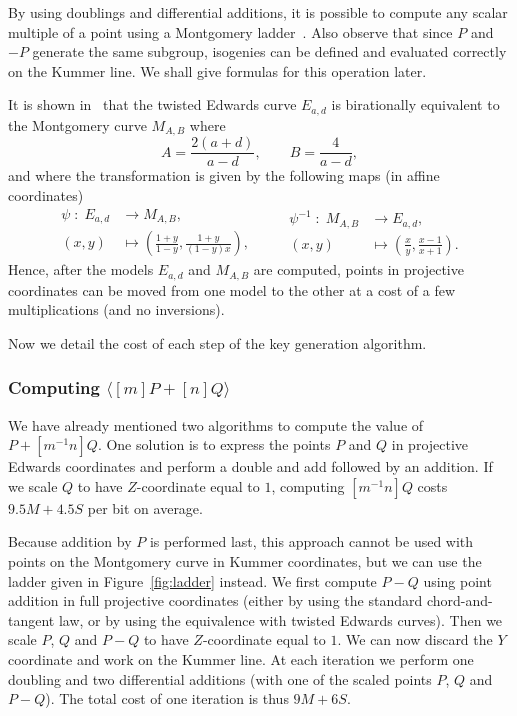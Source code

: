 \documentclass[jmc]{degruyter-journal-a}
\theoremstyle{definition}
\newcommand{\cyc}[1]{{\langle #1 \rangle}}
\begin{document}
By using doublings and differential additions, it is possible to
compute any scalar multiple of a point using a Montgomery
ladder~\cite{montgomery}. Also observe that since $P$ and $-P$
generate the same subgroup, isogenies can be defined and evaluated
correctly on the Kummer line. We shall give formulas for this
operation later.

It is shown in~\cite{twisted-edwards} that the twisted Edwards curve
$E_{a,d}$ is birationally equivalent to the Montgomery curve $M_{A,B}$
where
\begin{equation}
  A = \frac{2(a+d)}{a-d}, \qquad B = \frac{4}{a-d},
\end{equation}
and where the transformation is given by the following maps (in
affine coordinates)
\begin{equation}
  \label{eq:birational}
  \begin{aligned}
    \psi\;:\;E_{a,d}&\to M_{A,B},\\
    (x,y) &\mapsto \left(\frac{1+y}{1-y}, \frac{1+y}{(1-y)x}\right),
  \end{aligned}
  \qquad
  \begin{aligned}
    \psi^{-1}\;:\;M_{A,B}&\to E_{a,d},\\
    (x,y) &\mapsto \left(\frac{x}{y}, \frac{x-1}{x+1}\right).
  \end{aligned}
\end{equation}
Hence, after the models $E_{a,d}$ and $M_{A,B}$ are computed, points
in projective coordinates can be moved from one model to the other at
a cost of a few multiplications (and no inversions).

Now we detail the cost of each step of the key generation algorithm.

\subsubsection{Computing $\cyc{[m]P+[n]Q}$}\label{sssec:montgomery-ladder}

We have already mentioned two algorithms to compute the value of
$P+[m^{-1}n]Q$. One solution is to express the points $P$ and $Q$ in
projective Edwards coordinates and perform a double and add followed
by an addition. If we scale $Q$ to have $Z$-coordinate equal to $1$,
computing $[m^{-1}n]Q$ costs $9.5M+4.5S$ per bit on average.

Because addition by $P$ is performed last, this approach cannot
be used with points on the Montgomery curve in Kummer coordinates, but
we can use the ladder given in Figure~\ref{fig:ladder} instead. We
first compute $P-Q$ using point addition in full projective
coordinates (either by using the standard chord-and-tangent law, or by
using the equivalence with twisted Edwards curves). Then we scale $P$,
$Q$ and $P-Q$ to have $Z$-coordinate equal to $1$. We can now discard
the $Y$ coordinate and work on the Kummer line. At each iteration we
perform one doubling and two differential additions (with one of the
scaled points $P$, $Q$ and $P-Q$). The total cost of one iteration is
thus $9M+6S$.
\end{document}
